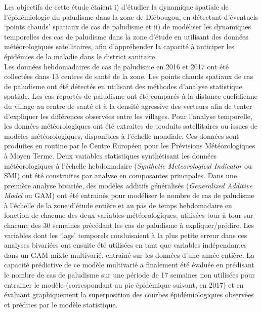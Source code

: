 \documentclass[12pt,twoside]{reedthesis}
\begin{document}
Les objectifs de cette étude étaient i) d'étudier la dynamique spatiale de l'épidémiologie du paludisme dans la zone de Diébougou, en détectant d'éventuels `points chauds' spatiaux de cas de paludisme et ii) de modéliser les dynamiques temporelles des cas de paludisme dans la zone d'étude en utilisant des données météorologiques satellitaires, afin d'appréhender la capacité à anticiper les épidémies de la maladie dans le district sanitaire.\\

Les données hebdomadaires de cas de paludisme en 2016 et 2017 ont été collectées dans 13 centres de santé de la zone. Les points chauds spatiaux de cas de paludisme ont été détectés en utilisant des méthodes d'analyse statistique spatiale. Les cas reportés de paludisme ont été comparés à la distance euclidienne du village au centre de santé et à la densité agressive des vecteurs afin de tenter d'expliquer les différences observées entre les villages. Pour l'analyse temporelle, les données météorologiques ont été extraites de produits satellitaires ou issues de modèles météorologiques, disponibles à l'échelle mondiale. Ces données sont produites en routine par le Centre Européen pour les Prévisions Météorologiques à Moyen Terme. Deux variables statistiques synthétisant les données météorologiques à l'échelle hebdomadaire (\emph{Synthetic Meteorological Indicator} ou SMI) ont été construites par analyse en composantes principales. Dans une première analyse bivariée, des modèles additifs généralisés (\emph{Generalized Additive Model} ou GAM) ont été entrainés pour modéliser le nombre de cas de paludisme à l'échelle de la zone d'étude entière et au pas de temps hebdomadaire en fonction de chacune des deux variables météorologiques, utilisées tour à tour sur chacune des 30 semaines précédant les cas de paludisme à expliquer/prédire. Les variables dont les `lags' temporels conduisaient à la plus petite erreur dans ces analyses bivariées ont ensuite été utilisées en tant que variables indépendantes dans un GAM mixte multivarié, entrainé sur les données d'une année entière. La capacité prédictive de ce modèle multivarié a finalement été évaluée en prédisant le nombre de cas de paludisme sur une période de 17 semaines non utilisées pour entrainer le modèle (correspondant au pic épidémique suivant, en 2017) et en évaluant graphiquement la superposition des courbes épidémiologiques observées et prédites par le modèle statistique.\\
\end{document}
